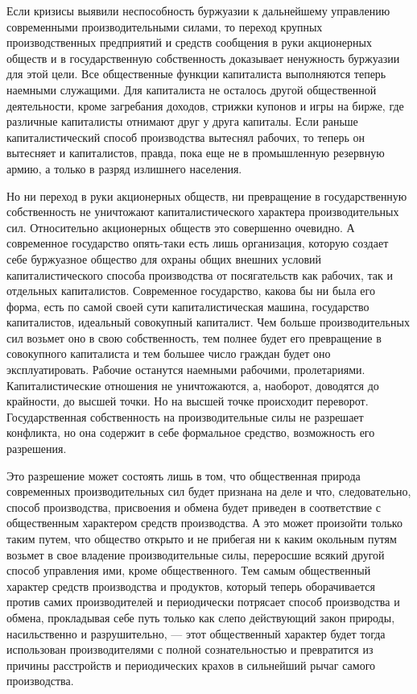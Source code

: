 \documentclass[12pt]{article}
\newcommand{\parnum}{(\arabic{parcount})}
\newcounter{parcount}
\newenvironment{parnumbers}{%
  \par%
  \everypar{\noindent \stepcounter{parcount}\marginpar[]{\parnum}}%
}{}
\begin{document}
\begin{parnumbers}
    Если кризисы выявили неспособность буржуазии к дальнейшему управлению современными производительными силами, то переход крупных производственных предприятий и средств сообщения в руки акционерных обществ и в государственную собственность доказывает ненужность буржуазии для этой цели. Все общественные функции капиталиста выполняются теперь наемными служащими. Для капиталиста не осталось другой общественной деятельности, кроме загребания доходов, стрижки купонов и игры на бирже, где различные капиталисты отнимают друг у друга капиталы. Если раньше капиталистический способ производства вытеснял рабочих, то теперь он вытесняет и капиталистов, правда, пока еще не в промышленную резервную армию, а только в разряд излишнего населения.

    Но ни переход в руки акционерных обществ, ни превращение в государственную собственность не уничтожают капиталистического характера производительных сил. Относительно акционерных обществ это совершенно очевидно. А современное государство опять-таки есть лишь организация, которую создает себе буржуазное общество для охраны общих внешних условий капиталистического способа производства от посягательств как рабочих, так и отдельных капиталистов. Современное государство, какова бы ни была его форма, есть по самой своей сути капиталистическая машина, государство капиталистов, идеальный совокупный капиталист. Чем больше производительных сил возьмет оно в свою собственность, тем полнее будет его превращение в совокупного капиталиста и тем большее число граждан будет оно эксплуатировать. Рабочие останутся наемными рабочими, пролетариями. Капиталистические отношения не уничтожаются, а, наоборот, доводятся до крайности, до высшей точки. Но на высшей точке происходит переворот. Государственная собственность на производительные силы не разрешает конфликта, но она содержит в себе формальное средство, возможность его разрешения.

    Это разрешение может состоять лишь в том, что общественная природа современных производительных сил будет признана на деле и что, следовательно, способ производства, присвоения и обмена будет приведен в соответствие с общественным характером средств производства. А это может произойти только таким путем, что общество открыто и не прибегая ни к каким окольным путям возьмет в свое владение производительные силы, переросшие всякий другой способ управления ими, кроме общественного. Тем самым общественный характер средств производства и продуктов, который теперь оборачивается против самих производителей и периодически потрясает способ производства и обмена, прокладывая себе путь только как слепо действующий закон природы, насильственно и разрушительно, — этот общественный характер будет тогда использован производителями с полной сознательностью и превратится из причины расстройств и периодических крахов в сильнейший рычаг самого производства.


\end{parnumbers}
\end{document}
